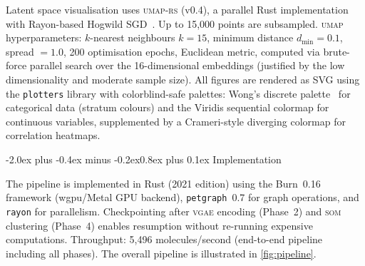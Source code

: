 \documentclass[10pt,a4paper,twocolumn]{article}
\makeatletter
\newcommand{\vgae}{\textsc{vgae}}
\newcommand{\som}{\textsc{som}}
\newcommand{\umap}{\textsc{umap}}
\renewcommand\subsection{\@startsection{subsection}{2}{\z@}%
  {-2.0ex plus -0.4ex minus -0.2ex}{0.8ex plus 0.1ex}%
  {\normalfont\large\bfseries}}
\makeatother
\begin{document}
Latent space visualisation uses \textsc{umap-rs} (v0.4), a parallel Rust implementation with Rayon-based Hogwild SGD~\cite{mcinnes2018}. Up to 15,000 points are subsampled. \umap{} hyperparameters: $k$-nearest neighbours $k=15$, minimum distance $d_{\min}=0.1$, spread $=1.0$, 200 optimisation epochs, Euclidean metric, computed via brute-force parallel search over the 16-dimensional embeddings (justified by the low dimensionality and moderate sample size). All figures are rendered as SVG using the \texttt{plotters} library with colorblind-safe palettes: Wong's discrete palette~\cite{wong2011} for categorical data (stratum colours) and the Viridis sequential colormap for continuous variables, supplemented by a Crameri-style diverging colormap for correlation heatmaps.

\subsection{Implementation}

The pipeline is implemented in Rust (2021 edition) using the Burn~0.16 framework (wgpu/Metal GPU backend), \texttt{petgraph}~0.7 for graph operations, and \texttt{rayon} for parallelism. Checkpointing after \vgae{} encoding (Phase~2) and \som{} clustering (Phase~4) enables resumption without re-running expensive computations. Throughput: 5,496 molecules/second (end-to-end pipeline including all phases). The overall pipeline is illustrated in \cref{fig:pipeline}.
\end{document}
